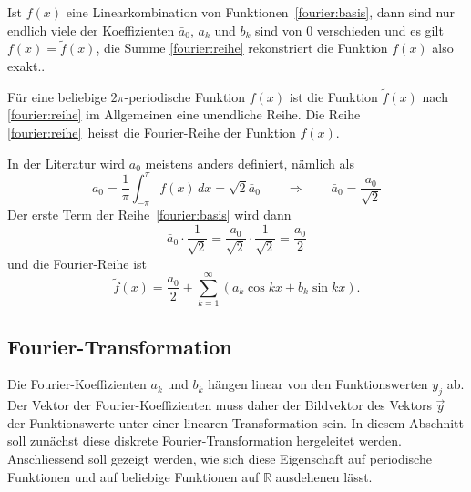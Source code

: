 Ist $f(x)$ eine Linearkombination von Funktionen~\eqref{fourier:basis},
dann sind nur endlich viele der Koeffizienten $\bar{a}_0$, $a_k$ und $b_k$
sind von $0$ verschieden und es gilt $f(x)=\tilde f(x)$, die Summe
\eqref{fourier:reihe} rekonstriert die Funktion $f(x)$ also exakt..

Für eine beliebige $2\pi$-periodische Funktion $f(x)$ ist die Funktion
$\tilde f(x)$ nach \eqref{fourier:reihe} im Allgemeinen eine unendliche
Reihe.
Die Reihe \eqref{fourier:reihe} heisst die Fourier-Reihe der Funktion 
$f(x)$.

In der Literatur wird $a_0$ meistens anders definiert, nämlich als
\[
a_0 = \frac1{\pi}\int_{-\pi}^{\pi} f(x)\,dx = \sqrt{2}\bar{a}_0
\qquad\Rightarrow\qquad
\bar{a}_0 = \frac{a_0}{\sqrt{2}}
\]
Der erste Term der Reihe~\eqref{fourier:basis} wird dann
\[
\bar{a}_0\cdot\frac1{\sqrt{2}}
=
\frac{a_0}{\sqrt{2}}\cdot\frac{1}{\sqrt{2}}
=
\frac{a_0}2
\]
und die Fourier-Reihe ist
\begin{equation}
\tilde f(x)
=
\frac{a_0}2
+
\sum_{k=1}^\infty (a_k\cos kx+b_k\sin kx).
\end{equation}

\subsection{Fourier-Transformation}
Die Fourier-Koeffizienten $a_k$ und $b_k$ hängen linear von den
Funktionswerten $y_j$ ab.
Der Vektor der Fourier-Koeffizienten muss daher der Bildvektor des
Vektors $\vec y$ der Funktionswerte unter einer linearen Transformation
sein.
In diesem Abschnitt soll zunächst diese diskrete Fourier-Transformation 
hergeleitet werden.
Anschliessend soll gezeigt werden, wie sich diese Eigenschaft auf 
periodische Funktionen und auf beliebige Funktionen auf $\mathbb R$
ausdehenen lässt.

